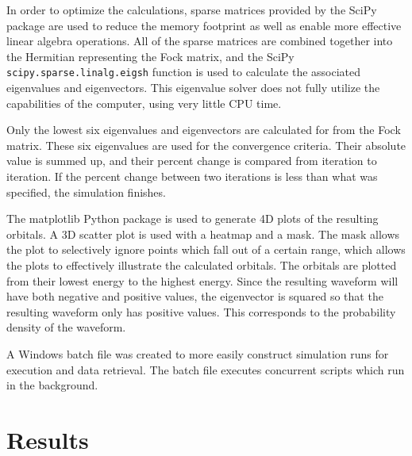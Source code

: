 \documentclass[10pt, oneside, letterpaper]{article}
\begin{document}
In order to optimize the calculations, sparse matrices provided by the SciPy package are used to reduce the memory footprint as well as enable more effective linear algebra operations. All of the sparse matrices are combined together into the Hermitian representing the Fock matrix, and the SciPy \texttt{scipy.sparse.linalg.eigsh} function is used to calculate the associated eigenvalues and eigenvectors. This eigenvalue solver does not fully utilize the capabilities of the computer, using very little CPU time.

Only the lowest six eigenvalues and eigenvectors are calculated for from the Fock matrix. These six eigenvalues are used for the convergence criteria. Their absolute value is summed up, and their percent change is compared from iteration to iteration. If the percent change between two iterations is less than what was specified, the simulation finishes.

The matplotlib Python package is used to generate 4D plots of the resulting orbitals. A 3D scatter plot is used with a heatmap and a mask. The mask allows the plot to selectively ignore points which fall out of a certain range, which allows the plots to effectively illustrate the calculated orbitals. The orbitals are plotted from their lowest energy to the highest energy. Since the resulting waveform will have both negative and positive values, the eigenvector is squared so that the resulting waveform only has positive values. This corresponds to the probability density of the waveform.

A Windows batch file was created to more easily construct simulation runs for execution and data retrieval. The batch file executes concurrent scripts which run in the background.

\newpage
\section{Results}
\end{document}
